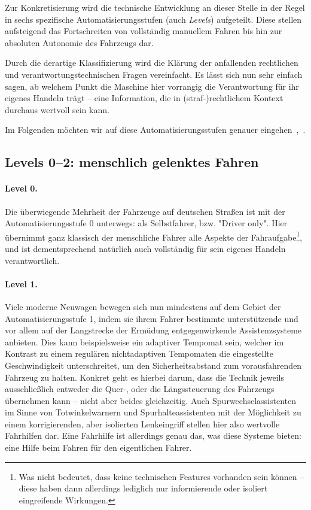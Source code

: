 \documentclass[twocolumn, german]{tum-article}
\begin{document}
Zur Konkretisierung wird die technische Entwicklung an dieser Stelle in der Regel in sechs spezifische Automatisierungsstufen (auch \emph{Levels}) aufgeteilt.
Diese stellen aufsteigend das Fortschreiten von vollständig manuellem Fahren bis hin zur absoluten Autonomie des Fahrzeugs dar.

Durch die derartige Klassifizierung wird die Klärung der anfallenden rechtlichen und verantwortungstechnischen Fragen vereinfacht.
Es lässt sich nun sehr einfach sagen, ab welchem Punkt die Maschine hier vorrangig die Verantwortung für ihr eigenes Handeln trägt -- eine Information, die in (straf-)rechtlichem Kontext durchaus wertvoll sein kann.

Im Folgenden möchten wir auf diese Automatisierungsstufen genauer eingehen~\cite{sae-levels},~\cite{bast-levels}.

\subsection{Levels 0--2: menschlich gelenktes Fahren}
\paragraph{Level 0.}
Die überwiegende Mehrheit der Fahrzeuge auf deutschen Straßen ist mit der Automatisierungsstufe 0 unterwegs: als Selbstfahrer, bzw. "Driver only".
Hier übernimmt ganz klassisch der menschliche Fahrer alle Aspekte der Fahraufgabe\footnote{Was nicht bedeutet, dass keine technischen Features vorhanden sein können -- diese haben dann allerdings lediglich nur informierende oder isoliert eingreifende Wirkungen.}, und ist dementsprechend natürlich auch vollständig für sein eigenes Handeln verantwortlich.
	
	
\paragraph{Level 1.}
Viele moderne Neuwagen bewegen sich nun mindestens auf dem Gebiet der Automatisierungsstufe 1, indem sie ihrem Fahrer bestimmte unterstützende und vor allem auf der Langstrecke der Ermüdung entgegenwirkende Assistenzsysteme anbieten.
Dies kann beispielsweise ein adaptiver Tempomat sein, welcher im Kontrast zu einem regulären nichtadaptiven Tempomaten die eingestellte Geschwindigkeit unterschreitet, um den Sicherheitsabstand zum vorausfahrenden Fahrzeug zu halten.
Konkret geht es hierbei darum, dass die Technik jeweils ausschließlich entweder die Quer-, oder die Längssteuerung des Fahrzeugs übernehmen kann -- nicht aber beides gleichzeitig.
Auch Spurwechselassistenten im Sinne von Totwinkelwarnern und Spurhalteassistenten mit der Möglichkeit zu einem korrigierenden, aber isolierten Lenkeingriff stellen hier also wertvolle Fahrhilfen dar.
Eine Fahrhilfe ist allerdings genau das, was diese Systeme bieten: eine Hilfe beim Fahren für den eigentlichen Fahrer.
	
\end{document}
